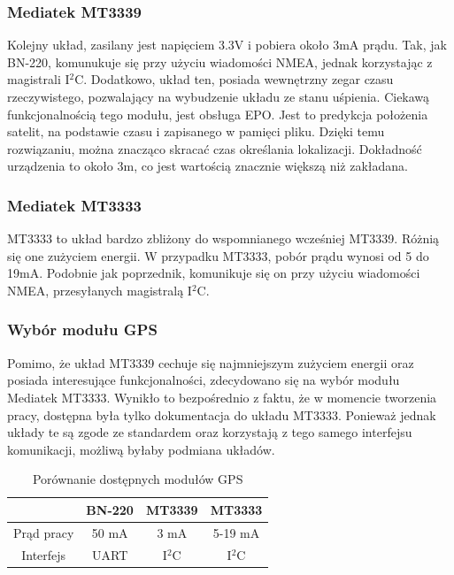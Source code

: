 \subsubsection{Mediatek MT3339}
Kolejny układ, zasilany jest napięciem 3.3V i pobiera około 3mA prądu. Tak, jak BN-220, komunukuje się przy użyciu wiadomości NMEA, jednak korzystając z magistrali I$^{2}$C. Dodatkowo, układ ten, posiada wewnętrzny zegar czasu rzeczywistego, pozwalający na wybudzenie układu ze stanu uśpienia. Ciekawą funkcjonalnością tego modułu, jest obsługa EPO. Jest to predykcja położenia satelit, na podstawie czasu i zapisanego w pamięci pliku. Dzięki temu rozwiązaniu, można znacząco skracać czas określania lokalizacji. Dokładność urządzenia to około 3m, co jest wartością znacznie większą niż zakładana.\cite{MT3339}

\subsubsection{Mediatek MT3333}
MT3333 to układ bardzo zbliżony do wspomnianego wcześniej MT3339. Różnią się one zużyciem energii. W przypadku MT3333, pobór prądu wynosi od 5 do 19mA. Podobnie jak poprzednik, komunikuje się on przy użyciu wiadomości NMEA, przesyłanych magistralą I$^{2}$C.\cite{MT3333}

\subsubsection{Wybór modułu GPS}
Pomimo, że układ MT3339 cechuje się najmniejszym zużyciem energii oraz posiada interesujące funkcjonalności, zdecydowano się na wybór modułu Mediatek MT3333. Wynikło to bezpośrednio z faktu, że w momencie tworzenia pracy, dostępna była tylko dokumentacja do układu MT3333. Ponieważ jednak układy te są zgode ze standardem oraz korzystają z tego samego interfejsu komunikacji, możliwą byłaby podmiana układów.

\begin{table}[h]
    \centering
    \begin{tabular}{|c | c | c | c|}
        \hline
         & BN-220 & MT3339 & MT3333 \\
        \hline
        Prąd pracy  & 50 mA & 3 mA &5-19 mA \\
        \hline
        Interfejs & UART & I$^{2}$C & I$^{2}$C\\
        \hline
    \end{tabular}
    \caption{Porównanie dostępnych modułów GPS}
    \label{tab:gps}
    \end{table}

